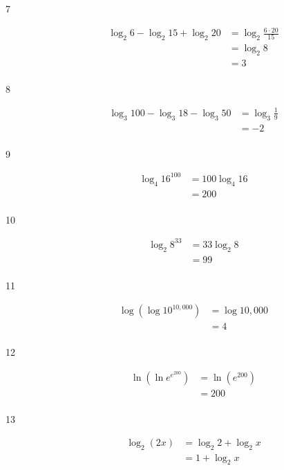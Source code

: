 \documentclass{exam}
\begin{document}
\begin{description}
      \item[7] 
        \begin{align*}
          \log_2 6 - \log_2 15 + \log_2 20 &= \log_2 \frac{6 \cdot 20}{15} \\
                                           &= \log_2 8 \\
                                           &= 3 \\
        \end{align*}

      \item[8] 
        \begin{align*}
          \log_3 100 - \log_3 18 - \log_3 50 &= \log_3 \frac{1}{9} \\
                                             &= -2 \\
        \end{align*}

      \item[9] 
        \begin{align*}
          \log_4 16^{100} &= 100 \log_4 16 \\
                          &= 200 \\
        \end{align*}

      \item[10] 
        \begin{align*}
          \log_2 8^{33} &= 33 \log_2 8 \\
                        &= 99 \\
        \end{align*}

      \item[11] 
        \begin{align*}
          \log \left( \log 10^{10,000} \right) &= \log 10,000 \\
                                               &= 4 \\
        \end{align*}

      \item[12] 
        \begin{align*}
          \ln \left( \ln e^{e^{200}} \right) &= \ln \left( e^{200} \right) \\
                                             &= 200 \\
        \end{align*}

      \item[13] 
        \begin{align*}
          \log_2 \left( 2x \right) &= \log_2 2 + \log_2 x \\
                                   &= 1 + \log_2 x \\
        \end{align*}


\end{description}
\end{document}
